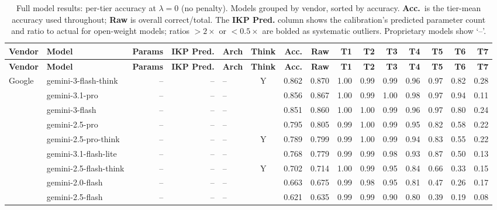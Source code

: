 \small
\setlength{\tabcolsep}{4pt}
\begin{longtable}{@{}ll r r l c rr rrrrrrr@{}}
\caption{Full model results: per-tier accuracy at $\lambda=0$ (no penalty). Models grouped by vendor, sorted by accuracy. \textbf{Acc.}\ is the tier-mean accuracy used throughout; \textbf{Raw} is overall correct/total. The \textbf{IKP Pred.} column shows the calibration's predicted parameter count and ratio to actual for open-weight models; ratios $>2\times$ or $<0.5\times$ are bolded as systematic outliers. Proprietary models show `--'.}
\label{tab:full-accuracy} \\
\toprule
\textbf{Vendor} & \textbf{Model} & \textbf{Params} & \textbf{IKP Pred.} & \textbf{Arch} & \textbf{Think} & \textbf{Acc.} & \textbf{Raw} & \textbf{T1} & \textbf{T2} & \textbf{T3} & \textbf{T4} & \textbf{T5} & \textbf{T6} & \textbf{T7} \\
\midrule
\endfirsthead
\toprule
\textbf{Vendor} & \textbf{Model} & \textbf{Params} & \textbf{IKP Pred.} & \textbf{Arch} & \textbf{Think} & \textbf{Acc.} & \textbf{Raw} & \textbf{T1} & \textbf{T2} & \textbf{T3} & \textbf{T4} & \textbf{T5} & \textbf{T6} & \textbf{T7} \\
\midrule
\endhead
\bottomrule
\endfoot
Google & gemini-3-flash-think & -- & -- & -- & Y & 0.862 & 0.870 & 1.00 & 0.99 & 0.99 & 0.96 & 0.97 & 0.82 & 0.28 \\
 & gemini-3.1-pro & -- & -- & -- &  & 0.856 & 0.867 & 1.00 & 0.99 & 1.00 & 0.98 & 0.97 & 0.94 & 0.11 \\
 & gemini-3-flash & -- & -- & -- &  & 0.851 & 0.860 & 1.00 & 1.00 & 0.99 & 0.96 & 0.97 & 0.80 & 0.24 \\
 & gemini-2.5-pro & -- & -- & -- &  & 0.795 & 0.805 & 0.99 & 1.00 & 0.99 & 0.95 & 0.82 & 0.58 & 0.22 \\
 & gemini-2.5-pro-think & -- & -- & -- & Y & 0.789 & 0.799 & 0.99 & 1.00 & 0.99 & 0.94 & 0.83 & 0.55 & 0.22 \\
 & gemini-3.1-flash-lite & -- & -- & -- &  & 0.768 & 0.779 & 0.99 & 0.99 & 0.98 & 0.93 & 0.87 & 0.50 & 0.13 \\
 & gemini-2.5-flash-think & -- & -- & -- & Y & 0.702 & 0.714 & 1.00 & 0.99 & 0.95 & 0.84 & 0.66 & 0.33 & 0.15 \\
 & gemini-2.0-flash & -- & -- & -- &  & 0.663 & 0.675 & 0.99 & 0.98 & 0.95 & 0.81 & 0.47 & 0.26 & 0.17 \\
 & gemini-2.5-flash & -- & -- & -- &  & 0.621 & 0.635 & 0.99 & 0.99 & 0.90 & 0.80 & 0.39 & 0.19 & 0.08 \\

\end{longtable}
